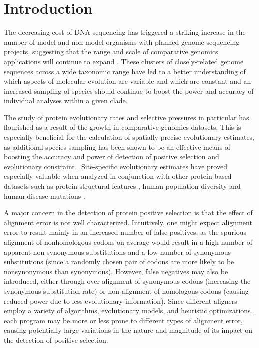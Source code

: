 \documentclass{article}
\begin{document}


\section*{Introduction}

The decreasing cost of DNA sequencing has triggered a striking
increase in the number of model and non-model organisms with planned
genome sequencing projects, suggesting that the range and scale of
comparative genomics applications will continue to expand
\citep{Green20072x,2007Identification}. These clusters of
closely-related genome sequences across a wide taxonomic range have
led to a better understanding of which aspects of molecular evolution
are variable and which are constant \citep{Wolf2009Nonlinear} and an
increased sampling of species should continue to boost the power and
accuracy of individual analyses within a given clade.

The study of protein evolutionary rates and selective pressures in
particular has flourished as a result of the growth in comparative
genomics datasets. This is especially beneficial for the calculation
of spatially precise evolutionary estimates, as additional species
sampling has been shown to be an effective means of boosting the
accuracy and power of \sw detection of positive selection and
evolutionary constraint
\citep{Anisimova2001Accuracy,Massingham2005Detecting}. Site-specific
evolutionary estimates have proved especially valuable when analyzed
in conjunction with other protein-based datasets such as protein
structural features \citep{Lin2007Proportion,Ramsey2011Relationship},
human population diversity \citep{2010Map} and human disease
mutations \citep{Arbiza2006Selective}.

A major concern in the detection of protein positive selection is that
the effect of alignment error is not well characterized. Intuitively,
one might expect alignment error to result mainly in an increased
number of false positives, as the spurious alignment of nonhomologous
codons on average would result in a high number of apparent
non-synonymous substitutions and a low number of synonymous
substitutions (since a randomly chosen pair of codons are more likely
to be nonsynonymous than synonymous). However, false negatives may
also be introduced, either through over-alignment of synonymous codons
(increasing the synonymous substitution rate) or non-alignment of
homologous codons (causing reduced power due to less evolutionary
information). Since different aligners employ a variety of algorithms,
evolutionary models, and heuristic optimizations
\citep{Notredame2007Recent}, each program may be more or less prone to
different types of alignment error, causing potentially large
variations in the nature and magnitude of its impact on the detection
of positive selection.
\end{document}
